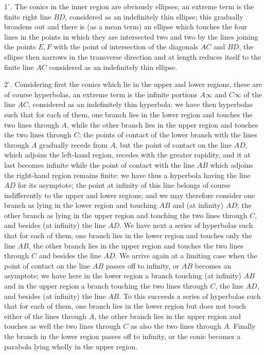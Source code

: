 \documentclass[11pt]{article}
\begin{document}
$1^{\circ}$. The conics in the inner region are obviously ellipses; an extreme term is
the finite right line $BD$, considered as an indefinitely thin ellipse; this gradually
broadens out and there is (as a mean term) an ellipse which touches the four lines in
the points in which they are intersected two and two by the lines joining the points
$E,F$ with the point of intersection of the diagonals $AC$ and $BD$, the ellipse then
narrows in the transverse direction and at length reduces itself to the finite line
$AC$ considered as an indefinitely thin ellipse.

$2^{\circ}$. Considering first the conics which lie in the upper and lower regions,
these are of course hyperbolas, an extreme term is the infinite portions $A\infty$ and
$C\infty$ of the line $AC$, considered as an indefinitely thin hyperbola: we have then
hyperbolas such that for each of them, one branch lies in the lower region and touches
the two lines through $A$, while the other branch lies in the upper region and touches
the two lines through $C$; the points of contact of the lower branch with the lines
through $A$ gradually recede from $A$, but the point of contact on the line $AD$, which
adjoins the left-hand region, recedes with the greater rapidity, and it at last becomes
infinite while the point of contact with the line $AB$ which adjoins the right-hand
region remains finite: we have thus a hyperbola having the line $AD$ for its asymptote;
the point at infinity of this line belongs of course indifferently to the upper and
lower regions; and we may therefore consider one branch as lying in the lower region
and touching $AB$ and (at infinity) $AD$; the other branch as lying in the upper region
and touching the two lines through $C$, and besides (at infinity) the line $AD$. We
have next a series of hyperbolas such that for each of them, one branch lies in the
lower region and touches only the line $AB$, the other branch lies in the upper region
and touches the two lines through $C$ and besides the line $AD$. We arrive again at a
limiting case when the point of contact on the line $AB$ passes off to infinity, or
$AB$ becomes an asymptote; we have here in the lower region a branch touching (at
infinity) $AB$ and in the upper region a branch touching the two lines through $C$,
the line $AD$, and besides (at infinity) the line $AB$. To this succeeds a series of
hyperbolas such that for each of them, one branch lies in the lower region but does
not touch either of the lines through $A$, the other branch lies in the upper region
and touches as well the two lines through $C$ as also the two lines through $A$.
Finally the branch in the lower region passes off to infinity, or the conic becomes
a parabola lying wholly in the upper region.
\end{document}
